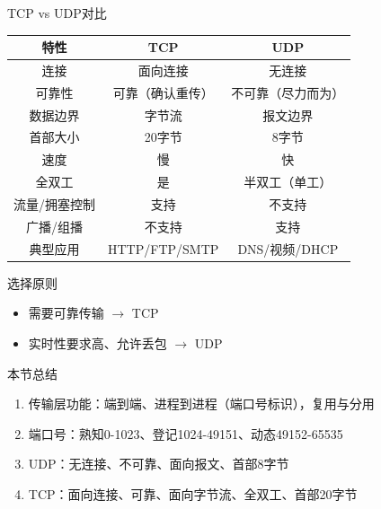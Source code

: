 \documentclass[10pt, aspectratio=169]{beamer}
\begin{document}
\begin{frame}{TCP vs UDP对比}
    \begin{table}
        \centering
        \begin{tabular}{|c|c|c|}
            \hline
            \textbf{特性} & \textbf{TCP} & \textbf{UDP} \\
            \hline
            连接 & 面向连接 & 无连接 \\
            可靠性 & 可靠（确认重传） & 不可靠（尽力而为） \\
            数据边界 & 字节流 & 报文边界 \\
            首部大小 & 20字节 & 8字节 \\
            速度 & 慢 & 快 \\
            全双工 & 是 & 半双工（单工） \\
            流量/拥塞控制 & 支持 & 不支持 \\
            广播/组播 & 不支持 & 支持 \\
            典型应用 & HTTP/FTP/SMTP & DNS/视频/DHCP \\
            \hline
        \end{tabular}
    \end{table}
    \vspace{0.5em}
    \begin{exampleblock}{选择原则}
        \begin{itemize}
            \item 需要可靠传输 $\rightarrow$ TCP
            \item 实时性要求高、允许丢包 $\rightarrow$ UDP
        \end{itemize}
    \end{exampleblock}
\end{frame}

\begin{frame}{本节总结}
    \begin{enumerate}
        \item 传输层功能：端到端、进程到进程（端口号标识），复用与分用
        \item 端口号：熟知0-1023、登记1024-49151、动态49152-65535
        \item UDP：无连接、不可靠、面向报文、首部8字节
        \item TCP：面向连接、可靠、面向字节流、全双工、首部20字节
    \end{enumerate}
\end{frame}
\end{document}

